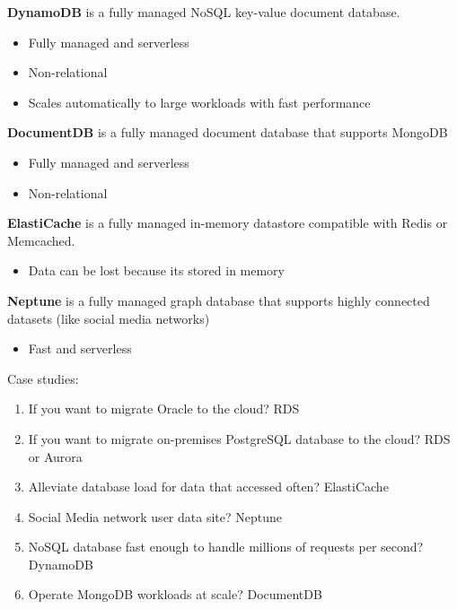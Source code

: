 \documentclass{article}%
\begin{document}
\textbf{DynamoDB} is a fully managed NoSQL key-value document database. 
\begin{itemize}
    \item Fully managed and serverless
    \item Non-relational
    \item Scales automatically to large workloads with fast performance
\end{itemize}
\textbf{DocumentDB} is a fully managed document database that supports MongoDB
\begin{itemize}
    \item Fully managed and serverless
    \item Non-relational
\end{itemize}
\textbf{ElastiCache} is a fully managed in-memory datastore compatible with Redis or Memcached. 
\begin{itemize}
    \item Data can be lost because its stored in memory
\end{itemize}
\textbf{Neptune} is a fully managed graph database that supports highly connected datasets (like social media networks)
\begin{itemize}
    \item Fast and serverless
\end{itemize}
Case studies:
\begin{enumerate}
    \item If you want to migrate Oracle to the cloud? RDS
    \item If you want to migrate on-premises PostgreSQL database to the cloud? RDS or Aurora
    \item Alleviate database load for data that accessed often? ElastiCache
    \item Social Media network user data site? Neptune
    \item NoSQL database fast enough to handle millions of requests per second? DynamoDB
    \item Operate MongoDB workloads at scale? DocumentDB
\end{enumerate}
\end{document}
